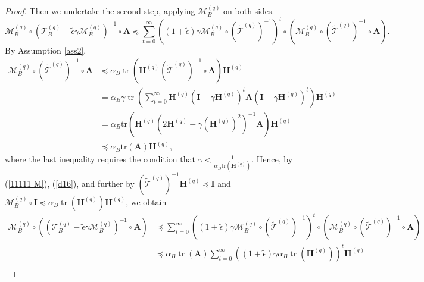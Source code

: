 \documentclass[11pt, letterpaper]{article}
\begin{document}
\begin{proof}
    Then we undertake the second step, applying $\mathcal{M}_B^{(q)}$ on both sides.
    \begin{equation}
        \label{11111 M}
        \mathcal{M}_B^{(q)} \circ({\mathcal{T}_B^{(q)}}-\tilde{\epsilon}\gamma \mathcal{M}_B^{(q)})^{-1}\circ\mathbf{A}\preceq\sum_{t=0}^\infty((1+\tilde{\epsilon})\gamma\mathcal{M}_B^{(q)}\circ{(\widetilde{\mathcal{T}}^{(q)})}^{-1})^t\circ(\mathcal{M}_B^{(q)}\circ{(\widetilde{\mathcal{T}}^{(q)})}^{-1}\circ\mathbf{A}).
    \end{equation}
    By Assumption \ref{ass2}, 
    \begin{equation}
    \label{d16}
        \begin{aligned}
            {\mathcal{M}_B^{(q)}}\circ{(\widetilde{\mathcal{T}}^{(q)})}^{-1}\circ\mathbf{A}&\preceq\alpha_B\operatorname{tr}(\mathbf{H}^{(q)}{(\widetilde{\mathcal{T}}^{(q)})}^{-1}\circ\mathbf{A})\mathbf{H}^{(q)}\\
            &= \alpha_B \gamma\operatorname{tr}\left(\sum_{t=0}^{\infty}\mathbf{H}^{(q)}(\mathbf{I}-\gamma\mathbf{H}^{(q)})^{t}\mathbf{A}(\mathbf{I}-\gamma\mathbf{H}^{(q)})^{t}\right) \mathbf{H}^{(q)}\\
            &= \alpha_B \mathrm{tr}\left(\mathbf{H}^{(q)}(2\mathbf{H}^{(q)}-\gamma(\mathbf{H}^{(q)})^{2})^{-1}\mathbf{A}\right)\mathbf{H}^{(q)}\\
            &\preceq \alpha_B \mathrm{tr}(\mathbf{A})\mathbf{H}^{(q)},
        \end{aligned}
    \end{equation}
    where the last inequality requires the condition that $\gamma < \frac{1}{\alpha_B\mathrm{tr}(\mathbf{H}^{(q)})}$.
    Hence, by (\ref{11111 M}), (\ref{d16}), and further by ${(\widetilde{\mathcal{T}}^{(q)})}^{-1}\mathbf{H}^{(q)}\preceq\mathbf{I}$ and $\mathcal{M}_B^{(q)}\circ\mathbf{I}\preceq\alpha_B\operatorname{tr}(\mathbf{H}^{(q)})\mathbf{H}^{(q)}$, we obtain
    \begin{equation*}
        \begin{aligned}
            \mathcal{M}_B^{(q)} \circ (({\mathcal{T}_B^{(q)}}-\tilde{\epsilon}\gamma \mathcal{M}_B^{(q)})^{-1}\circ\mathbf{A}) &\preceq\sum_{t=0}^\infty((1+\tilde{\epsilon})\gamma\mathcal{M}_B^{(q)}\circ{(\widetilde{\mathcal{T}}^{(q)})}^{-1})^t\circ(\mathcal{M}_B^{(q)}\circ{(\widetilde{\mathcal{T}}^{(q)})}^{-1}\circ\mathbf{A})\\
            &\preceq\alpha_B\operatorname{tr}(\mathbf{A})\sum_{t=0}^{\infty}((1+\tilde{\epsilon})\gamma\alpha_B\operatorname{tr}(\mathbf{H}^{(q)}))^t\mathbf{H}^{(q)}\\

\end{aligned}
\end{equation*}
\end{proof}
\end{document}
